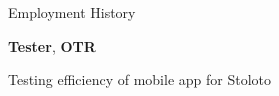 \begin{rubric}{Employment History}

\entry*[2018 -- 2018]%
	\textbf{Tester}, \textbf{OTR} \par Testing efficiency of mobile app for Stoloto
%
\end{rubric}